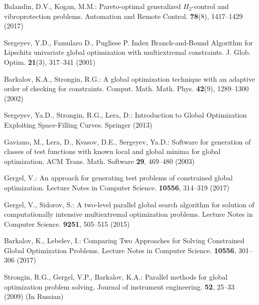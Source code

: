 \documentclass{llncs}
\begin{document}
\begin{thebibliography}{99}
Balandin, D.V., Kogan, M.M.: Pareto-optimal generalized $H_2$-control and vibroprotection problems. Automation and Remote Control. \textbf{78}(8), 1417--1429 (2017)

Sergeyev, Y.D., Famularo D., Pugliese P. Index Branch-and-Bound Algorithm for Lipschitz 
univariate global optimization with multiextremal constraints. J. Glob. Optim. \textbf{21}(3), 317--341 
(2001) 

Barkalov, K.A., Strongin, R.G.: A global optimization technique with an adaptive order of 
checking for constraints. Comput. Math. Math. Phys. \textbf{42}(9), 1289--1300 (2002)

Sergeyev, Ya.D., Strongin, R.G., Lera, D.: Introduction to Global Optimization Exploiting 
Space-Filling Curves. Springer (2013)

Gaviano, M., Lera, D., Kvasov, D.E., Sergeyev, Ya.D.: Software for generation of classes of 
test functions with known local and global minima for global optimization. ACM Trans. Math. 
Software \textbf{29}, 469--480 (2003)

Gergel, V.: An approach for generating test problems of constrained global optimization. 
Lecture Notes in Computer Science. \textbf{10556}, 314--319 (2017)


Gergel, V., Sidorov, S.: A two-level parallel global search algorithm for solution of 
computationally intensive multiextremal optimization problems. Lecture Notes in Computer Science. \textbf{9251}, 505--515 (2015)

Barkalov, K., Lebelev, I.: Comparing Two Approaches for Solving Constrained Global 
Optimization Problems. Lecture Notes in Computer Science. \textbf{10556}, 301--306 (2017)

Strongin, R.G., Gergel, V.P., Barkalov, K.A.: Parallel methods for global optimization problem 
solving. Journal of instrument engineering. \textbf{52}, 25--33 (2009) (In Russian)



%
\end{thebibliography}
\end{document}
